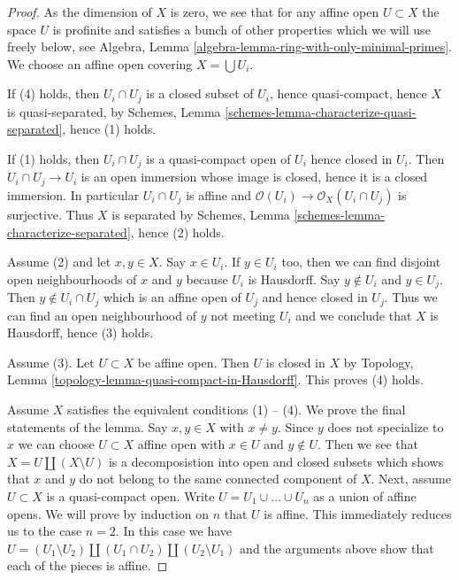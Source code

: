\documentclass[10pt,a4paper]{amsart}
\theoremstyle{plain}
\theoremstyle{definition}
\theoremstyle{remark}
\numberwithin{equation}{subsection}
\begin{document}
\begin{proof}
As the dimension of $X$ is zero, we see that for any affine open
$U \subset X$ the space $U$ is profinite and satisfies
a bunch of other properties which we will use freely below, see
Algebra, Lemma \ref{algebra-lemma-ring-with-only-minimal-primes}.
We choose an affine open covering $X = \bigcup U_i$.

\medskip\noindent
If (4) holds, then $U_i \cap U_j$ is a closed subset of
$U_i$, hence quasi-compact, hence $X$ is quasi-separated,
by Schemes, Lemma \ref{schemes-lemma-characterize-quasi-separated},
hence (1) holds.

\medskip\noindent
If (1) holds, then $U_i \cap U_j$ is a quasi-compact open
of $U_i$ hence closed in $U_i$. Then $U_i \cap U_j \to U_i$
is an open immersion whose image is closed, hence it is a
closed immersion. In particular $U_i \cap U_j$ is affine
and $\mathcal{O}(U_i) \to \mathcal{O}_X(U_i \cap U_j)$ is surjective.
Thus $X$ is separated
by Schemes, Lemma \ref{schemes-lemma-characterize-separated},
hence (2) holds.

\medskip\noindent
Assume (2) and let $x, y \in X$. Say $x \in U_i$. If $y \in U_i$
too, then we can find disjoint open neighbourhoods of $x$ and $y$
because $U_i$ is Hausdorff. Say $y \not \in U_i$ and $y \in U_j$.
Then $y \not \in U_i \cap U_j$ which is an affine open of $U_j$
and hence closed in $U_j$. Thus we can find an open neighbourhood
of $y$ not meeting $U_i$ and we conclude that $X$ is Hausdorff,
hence (3) holds.

\medskip\noindent
Assume (3). Let $U \subset X$ be affine open.
Then $U$ is closed in $X$ by Topology, Lemma
\ref{topology-lemma-quasi-compact-in-Hausdorff}.
This proves (4) holds.

\medskip\noindent
Assume $X$ satisfies the equivalent conditions (1) -- (4).
We prove the final statements of the lemma. Say $x, y \in X$
with $x \not = y$. Since $y$ does not specialize to $x$ we can
choose $U \subset X$ affine open with $x \in U$ and $y \not \in U$.
Then we see that $X = U \amalg (X \setminus U)$ is a decomposistion
into open and closed subsets which shows that $x$ and $y$ do not belong
to the same connected component of $X$. Next, assume $U \subset X$
is a quasi-compact open. Write $U = U_1 \cup \ldots \cup U_n$ as a union
of affine opens. We will prove by induction on $n$ that $U$ is affine.
This immediately reduces us to the case $n = 2$. In this case we have
$U = (U_1 \setminus U_2) \amalg (U_1 \cap U_2) \amalg (U_2 \setminus U_1)$
and the arguments above show that each of the pieces is affine.
\end{proof}
\end{document}
